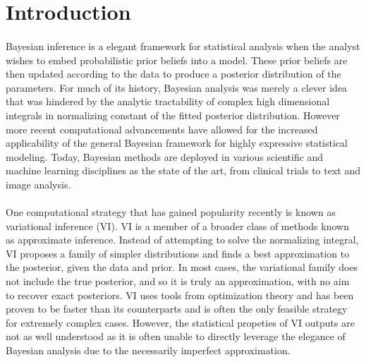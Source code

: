 

\section{Introduction}

\paragraph{} Bayesian inference is a elegant framework for statistical analysis when the analyst wishes to embed probabilistic prior beliefs into a model. These prior beliefs are then updated according to the data to produce a posterior distribution of the parameters. For much of its history, Bayesian analysis was merely a clever idea that was hindered by the analytic tractability of complex high dimensional integrals in normalizing constant of the fitted posterior distribution. However more recent computational advancements have allowed for the increased applicability of the general Bayesian framework for highly expressive statistical modeling. Today, Bayesian methods are deployed in various scientific and machine learning disciplines as the state of the art, from clinical trials to text and image analysis. 

\paragraph{} One computational strategy that has gained popularity recently is known as variational inference (VI). VI is a member of a broader class of methods known as approximate inference. Instead of attempting to solve the normalizing integral, VI proposes a family of simpler distributions and finds a best approximation to the posterior, given the data and prior. In most cases, the variational family does not include the true posterior, and so it is truly an approximation, with no aim to recover exact posteriors. VI uses tools from optimization theory and has been proven to be faster than its counterparts and is often the only feasible strategy for extremely complex cases. However, the statistical propeties of VI outputs are not as well understood as it is often unable to directly leverage the elegance of Bayesian analysis due to the necessarily imperfect approximation. 

